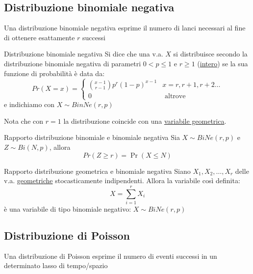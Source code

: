 \subsection{Distribuzione binomiale negativa}

\begin{tcolorbox}
	\begin{center}
		Una distribuzione binomiale negativa esprime il numero di lanci necessari al fine di ottenere esattamente $ r $ successi
	\end{center}
\end{tcolorbox}

\begin{definizione}{Distribuzione binomiale negativa}
	Si dice che una v.a. $ X $ si distribuisce secondo la distribuzione binomiale negativa di parametri $ 0 < p \le 1 $ e $ r \ge 1 $ (\underline{intero}) se la sua funzione di probabilità è data da:
	\[
		Pr\left(X = x\right) =
		\begin{cases}
			\binom{x-1}{r-1}p^{r}\left(1-p\right)^{x-1} & x = r, r +1, r+2\ldots \\
			0                                           & \text{ altrove }
		\end{cases}
	\]
	e indichiamo con $ X \sim BinNe\left(r,p\right) $
\end{definizione}
Nota che con $ r = 1 $ la distribuzione coincide con una \underline{variabile geometrica}.
\begin{teorema}{Rapporto distribuzione binomiale e binomiale negativa}
	Sia $ X \sim BiNe\left(r,p\right) $ e $ Z \sim Bi\left(N,p\right) $, allora
	\[
		Pr\left(Z \ge r\right) =\Pr\left(X \le  N\right)
	\]
\end{teorema}
\begin{teorema}{Rapporto distribuzione geometrica e binomiale negativa  }
	Siano $ X_1, X_2,\ldots ,X_r $ delle v.a. \underline{geometriche} stocasticamente indipendenti. Allora la variabile così definita:
	\[
		X = \sum_{i=1}^{r} X_i
	\]
	è una variabile di tipo binomiale negativo: $ X \sim BiNe\left(r,p\right) $
\end{teorema}
\subsection{Distribuzione di Poisson}
\label{vapoisson}
\begin{tcolorbox}
	\begin{center}
		Una distribuzione di Poisson esprime il numero di eventi successi in un determinato lasso di tempo/spazio
	\end{center}
\end{tcolorbox}

